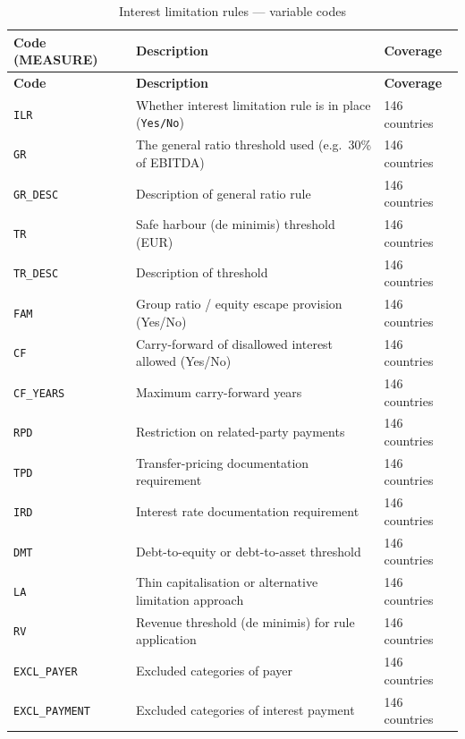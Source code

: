 \documentclass[11pt,a4paper]{article}
\begin{document}
\begin{longtable}{L{2.8cm} L{6.5cm} C{2.5cm}}
    \caption{Interest limitation rules --- variable codes}
    \label{tab:interest}\\
    \toprule
    \textbf{Code (MEASURE)} & \textbf{Description} & \textbf{Coverage} \\
    \midrule
    \endfirsthead
    \toprule
    \textbf{Code} & \textbf{Description} & \textbf{Coverage} \\
    \midrule
    \endhead
    \bottomrule
    \endlastfoot
    \texttt{ILR}         & Whether interest limitation rule is in place (\texttt{Yes/No}) & 146 countries \\
    \texttt{GR}          & The general ratio threshold used (e.g.\ 30\% of EBITDA) & 146 countries \\
    \texttt{GR\_DESC}    & Description of general ratio rule & 146 countries \\
    \texttt{TR}          & Safe harbour (de minimis) threshold (EUR) & 146 countries \\
    \texttt{TR\_DESC}    & Description of threshold & 146 countries \\
    \texttt{FAM}         & Group ratio / equity escape provision (Yes/No) & 146 countries \\
    \texttt{CF}          & Carry-forward of disallowed interest allowed (Yes/No) & 146 countries \\
    \texttt{CF\_YEARS}   & Maximum carry-forward years & 146 countries \\
    \texttt{RPD}         & Restriction on related-party payments & 146 countries \\
    \texttt{TPD}         & Transfer-pricing documentation requirement & 146 countries \\
    \texttt{IRD}         & Interest rate documentation requirement & 146 countries \\
    \texttt{DMT}         & Debt-to-equity or debt-to-asset threshold & 146 countries \\
    \texttt{LA}          & Thin capitalisation or alternative limitation approach & 146 countries \\
    \texttt{RV}          & Revenue threshold (de minimis) for rule application & 146 countries \\
    \texttt{EXCL\_PAYER} & Excluded categories of payer & 146 countries \\
    \texttt{EXCL\_PAYMENT}& Excluded categories of interest payment & 146 countries \\

\end{longtable}
\end{document}
